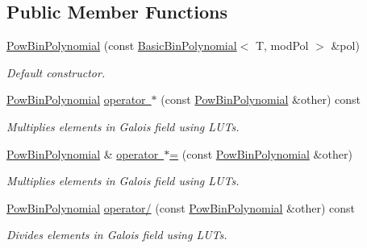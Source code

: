 \subsection*{Public Member Functions}
\begin{DoxyCompactItemize}
\item 
\mbox{\label{class_g_flinalg_1_1_pow_bin_polynomial_a8bba6f887115d20f25d906a69f47faa5}} 
\mbox{\hyperlink{class_g_flinalg_1_1_pow_bin_polynomial_a8bba6f887115d20f25d906a69f47faa5}{Pow\+Bin\+Polynomial}} (const \mbox{\hyperlink{class_g_flinalg_1_1_basic_bin_polynomial}{Basic\+Bin\+Polynomial}}$<$ T, mod\+Pol $>$ \&pol)
\begin{DoxyCompactList}\small\item\em Default constructor. \end{DoxyCompactList}\item 
\mbox{\hyperlink{class_g_flinalg_1_1_pow_bin_polynomial}{Pow\+Bin\+Polynomial}} \mbox{\hyperlink{class_g_flinalg_1_1_pow_bin_polynomial_ad0b7663c261f93051da600f72b901625}{operator $\ast$}} (const \mbox{\hyperlink{class_g_flinalg_1_1_pow_bin_polynomial}{Pow\+Bin\+Polynomial}} \&other) const
\begin{DoxyCompactList}\small\item\em Multiplies elements in Galois field using L\+U\+Ts. \end{DoxyCompactList}\item 
\mbox{\hyperlink{class_g_flinalg_1_1_pow_bin_polynomial}{Pow\+Bin\+Polynomial}} \& \mbox{\hyperlink{class_g_flinalg_1_1_pow_bin_polynomial_ac7f6ae1774920a62fd66f07e4e971c63}{operator $\ast$=}} (const \mbox{\hyperlink{class_g_flinalg_1_1_pow_bin_polynomial}{Pow\+Bin\+Polynomial}} \&other)
\begin{DoxyCompactList}\small\item\em Multiplies elements in Galois field using L\+U\+Ts. \end{DoxyCompactList}\item 
\mbox{\hyperlink{class_g_flinalg_1_1_pow_bin_polynomial}{Pow\+Bin\+Polynomial}} \mbox{\hyperlink{class_g_flinalg_1_1_pow_bin_polynomial_afd47f6a24660e985acf48ab216022767}{operator/}} (const \mbox{\hyperlink{class_g_flinalg_1_1_pow_bin_polynomial}{Pow\+Bin\+Polynomial}} \&other) const
\begin{DoxyCompactList}\small\item\em Divides elements in Galois field using L\+U\+Ts. \end{DoxyCompactList}\item 

\end{DoxyCompactItemize}
